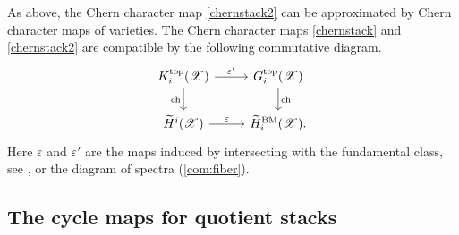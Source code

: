 \documentclass [11pt,oneside,a4paper,mathscr]{amsart}
\theoremstyle{definition}
\newcommand{\X}{\mathscr{X}}
\begin{document}
As above, the Chern character map \eqref{chernstack2} can be approximated by Chern character maps of varieties.
The Chern character maps \eqref{chernstack} and \eqref{chernstack2} are compatible 
by the following commutative diagram. 
\begin{equation}\label{chernKG}
    \begin{tikzcd}
        K^{\mathrm{top}}_i(\X)\arrow[d, "\mathrm{ch}"']\arrow[r, "\varepsilon'"]& G^{\mathrm{top}}_i(\X)\arrow[d, "\mathrm{ch}"]\\
        \widetilde{H}^i(\X)\arrow[r, "\varepsilon"]& \widetilde{H}^{\mathrm{BM}}_{i}(\X).
    \end{tikzcd}
\end{equation}
Here $\varepsilon$ and $\varepsilon'$ are the maps induced by intersecting with the fundamental class, see \cite[Section 5 and Property 2 from Section 4.1]{BF02392091}, or the diagram of spectra (\ref{com:fiber}). 







\subsection{The cycle maps for quotient stacks}
\end{document}
